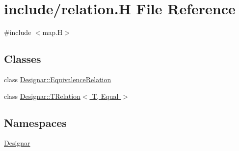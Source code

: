 \hypertarget{relation_8_h}{}\section{include/relation.H File Reference}
\label{relation_8_h}
{\ttfamily \#include $<$map.\+H$>$}\newline
\subsection*{Classes}
\begin{DoxyCompactItemize}
\item 
class \hyperlink{class_designar_1_1_equivalence_relation}{Designar\+::\+Equivalence\+Relation}
\item 
class \hyperlink{class_designar_1_1_t_relation}{Designar\+::\+T\+Relation$<$ T, Equal $>$}
\end{DoxyCompactItemize}
\subsection*{Namespaces}
\begin{DoxyCompactItemize}
\item 
 \hyperlink{namespace_designar}{Designar}
\end{DoxyCompactItemize}
